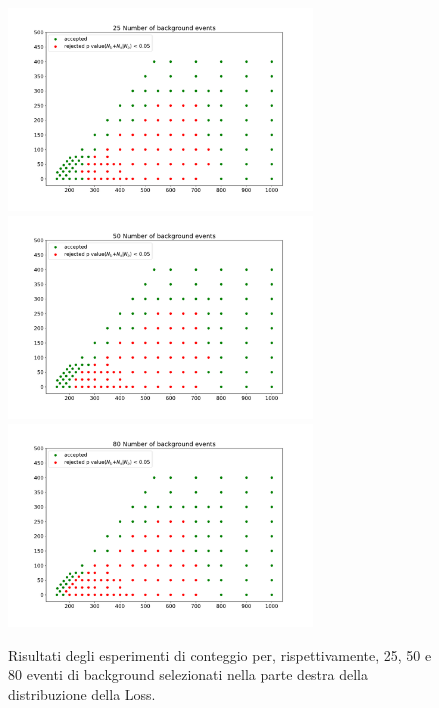 \begin{figure}[h!]
	\centering
	\includegraphics[width=0.72\textwidth]{figs/risultati_simulazione/25.pdf}
	\includegraphics[width=0.72\textwidth]{figs/risultati_simulazione/50.pdf}
	\includegraphics[width=0.72\textwidth]{figs/risultati_simulazione/80.pdf}
	\caption{Risultati degli esperimenti di conteggio per, rispettivamente, 25, 50 e 80 eventi di background selezionati nella parte destra della distribuzione della Loss.}
	\label{test-25-50-80}
\end{figure}
